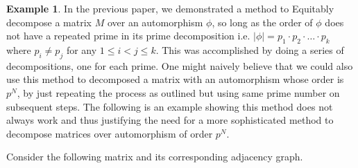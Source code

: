 \documentclass[preprint,12pt]{elsarticle}
\theoremstyle{definition}
\newtheorem{example}[thm]{Example}
\theoremstyle{remark}
\begin{document}
\begin{example}\label{ex:1}
In the previous paper, we demonstrated a method to Equitably decompose a matrix $M$ over an automorphism $\phi$, so long as the order of $\phi$ does not have a repeated prime in its prime decomposition i.e. $|\phi |=p_1\cdot p_2\cdot \dots \cdot p_k$ where $p_i\neq p_j$ for any $1\leq i < j \leq k$.  This was accomplished by doing a series of decompositions, one for each prime. One might naively believe that we could also use this method to decomposed a matrix with an automorphism whose order is $p^N$, by just repeating the process as outlined but using same prime number on subsequent steps.  The following is an example showing this method does  not always work and thus justifying the need for a more sophisticated method to decompose matrices over automorphism of order $p^N$.

Consider the following matrix and its corresponding adjacency graph.


\end{example}
\end{document}
